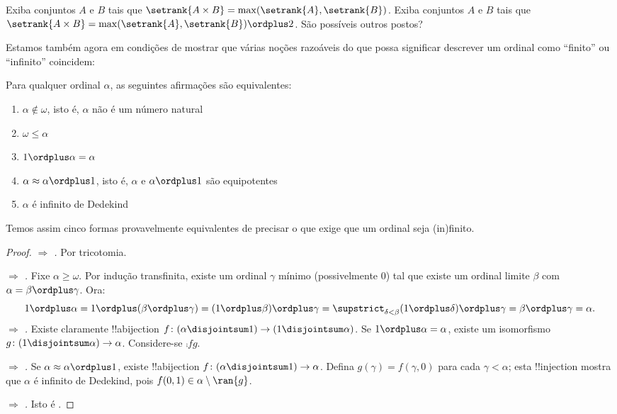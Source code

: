 \documentclass[../../../include/open-logic-section]{subfiles}
\begin{document}
\begin{prob}
Exiba conjuntos $A$ e $B$ tais que $\setrank{A \times B}=
\max(\setrank{A}, \setrank{B})$. Exiba conjuntos $A$ e $B$ tais que
$\setrank{A \times B}=\max(\setrank{A}, \setrank{B}) \ordplus  2$. São
possíveis outros postos?
\end{prob}

Estamos também agora em condições de mostrar que várias noções razoáveis
do que possa significar descrever um ordinal como ``finito'' ou ``infinito'' coincidem:

\begin{lem}
Para qualquer ordinal $\alpha$, as seguintes afirmações são equivalentes:
\begin{enumerate}
	\item{} $\alpha\notin \omega$, isto é,
	$\alpha$ não é um número natural
	\item{} $\omega \leq \alpha$
	\item{} $1 \ordplus  \alpha = \alpha$
	\item{} $\alpha \approx \alpha\ordplus 1$,
	isto é, $\alpha$ e $\alpha\ordplus 1$ são equipotentes
	\item{} $\alpha$ é infinito de Dedekind
	\end{enumerate}
\end{lem}
\noindent
Temos assim cinco formas provavelmente equivalentes de precisar o que exige que um ordinal seja (in)finito.

\begin{proof}
\emph{ $\Rightarrow$ .} Por
tricotomia.

\emph{ $\Rightarrow$ .} Fixe
$\alpha \geq \omega$. Por indução transfinita, existe um ordinal $\gamma$
mínimo (possivelmente $0$) tal que existe um ordinal limite $\beta$ com
$\alpha = \beta \ordplus \gamma$. Ora:
\[
	1 \ordplus \alpha =
	1 \ordplus (\beta \ordplus \gamma) =
	(1 \ordplus \beta) \ordplus \gamma =
	\supstrict_{\delta < \beta} (1 \ordplus  \delta) \ordplus  \gamma =
	\beta \ordplus  \gamma =
	\alpha.
\]
\emph{ $\Rightarrow$ .} Existe
claramente !!a{bijection} $f \colon (\alpha \disjointsum 1) \to (1
\disjointsum \alpha)$. Se $1 \ordplus \alpha = \alpha$, existe um
isomorfismo $g \colon (1 \disjointsum \alpha) \to \alpha$. Considere-se
$\comp{f}{g}$.

\emph{ $\Rightarrow$ .} Se
$\alpha \approx \alpha \ordplus 1$, existe !!a{bijection} $f \colon
(\alpha \disjointsum 1) \to \alpha$. Defina $g(\gamma) = f(\gamma, 0)$
para cada $\gamma < \alpha$; esta !!{injection} mostra que $\alpha$
é infinito de Dedekind, pois $f(0,1) \in \alpha \setminus \ran{g}$.

\emph{ $\Rightarrow$ .} Isto
é .
\end{proof}
\end{document}
